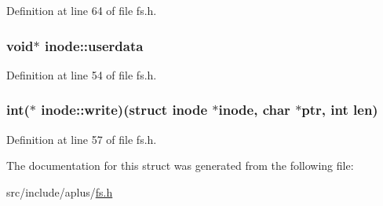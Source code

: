 Definition at line 64 of file fs.\+h.

\hypertarget{structinode_a8ba627a7ebbacc723e8452fbf8dd3670}{
\subsubsection[{userdata}]{\setlength{\rightskip}{0pt plus 5cm}void$\ast$ inode\+::userdata}}\label{structinode_a8ba627a7ebbacc723e8452fbf8dd3670}


Definition at line 54 of file fs.\+h.

\hypertarget{structinode_a53a123d38834fa17e7ef5c1e5f47bba2}{
\subsubsection[{write}]{\setlength{\rightskip}{0pt plus 5cm}int($\ast$ inode\+::write)(struct {\bf inode} $\ast${\bf inode}, char $\ast$ptr, int len)}}\label{structinode_a53a123d38834fa17e7ef5c1e5f47bba2}


Definition at line 57 of file fs.\+h.



The documentation for this struct was generated from the following file\+:\begin{DoxyCompactItemize}
\item 
src/include/aplus/\hyperlink{fs_8h}{fs.\+h}\end{DoxyCompactItemize}
